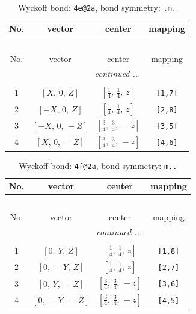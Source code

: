 \documentclass[fleqn,8pt]{jsarticle}
\begin{document}
\renewcommand{\arraystretch}{1.2}
\begin{longtable}{cccc}
\caption{Wyckoff bond: {\tt 4e@2a}, bond symmetry: {\tt .m.}}
 \\
 \hline \hline
No. & vector & center & mapping \\ \hline \endfirsthead

\multicolumn{3}{l}{\tablename\ \thetable{}} \\
 \hline \hline
No. & vector & center & mapping \\ \hline \endhead

 \hline \hline
\multicolumn{3}{r}{\footnotesize\it continued ...} \\ \endfoot

 \hline \hline
\multicolumn{3}{r}{} \\ \endlastfoot

1 & $\left[ X,\, 0,\, Z \right]$ & $\left[ \frac{1}{4},\, \frac{1}{4},\, z \right]$ & {\tt [1,7]} \\ \hline
2 & $\left[ - X,\, 0,\, Z \right]$ & $\left[ \frac{1}{4},\, \frac{1}{4},\, z \right]$ & {\tt [2,8]} \\ \hline
3 & $\left[ - X,\, 0,\, - Z \right]$ & $\left[ \frac{3}{4},\, \frac{3}{4},\, - z \right]$ & {\tt [3,5]} \\ \hline
4 & $\left[ X,\, 0,\, - Z \right]$ & $\left[ \frac{3}{4},\, \frac{3}{4},\, - z \right]$ & {\tt [4,6]} \\
\end{longtable}
\renewcommand{\arraystretch}{1.2}
\begin{longtable}{cccc}
\caption{Wyckoff bond: {\tt 4f@2a}, bond symmetry: {\tt m..}}
 \\
 \hline \hline
No. & vector & center & mapping \\ \hline \endfirsthead

\multicolumn{3}{l}{\tablename\ \thetable{}} \\
 \hline \hline
No. & vector & center & mapping \\ \hline \endhead

 \hline \hline
\multicolumn{3}{r}{\footnotesize\it continued ...} \\ \endfoot

 \hline \hline
\multicolumn{3}{r}{} \\ \endlastfoot

1 & $\left[ 0,\, Y,\, Z \right]$ & $\left[ \frac{1}{4},\, \frac{1}{4},\, z \right]$ & {\tt [1,8]} \\ \hline
2 & $\left[ 0,\, - Y,\, Z \right]$ & $\left[ \frac{1}{4},\, \frac{1}{4},\, z \right]$ & {\tt [2,7]} \\ \hline
3 & $\left[ 0,\, Y,\, - Z \right]$ & $\left[ \frac{3}{4},\, \frac{3}{4},\, - z \right]$ & {\tt [3,6]} \\ \hline
4 & $\left[ 0,\, - Y,\, - Z \right]$ & $\left[ \frac{3}{4},\, \frac{3}{4},\, - z \right]$ & {\tt [4,5]} \\
\end{longtable}
\end{document}
